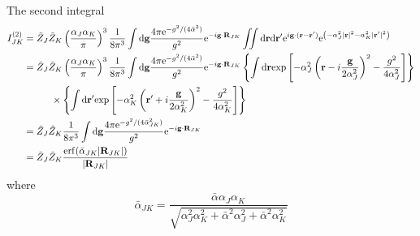 \documentclass[paper=a4, fontsize=11pt]{article} %
\numberwithin{equation}{section} %
\numberwithin{figure}{section} %
\numberwithin{table}{section} %
\newcommand{\bg}{{\bf{g}}}
\newcommand{\br}{{\bf{r}}}
\newcommand{\bR}{{\bf{R}}}
\newcommand{\rexp}{{\mathrm{exp}}}
\newcommand{\re}{{\mathrm{e}}}
\newcommand{\rerf}{{\mathrm{erf}}}
\newcommand{\rd}{{\mathrm{d}}}
\newcommand{\al}{{\alpha}}
\newcommand{\bal}{{\bar{\alpha}}}
\begin{document}
The second integral
\begin{equation}
\begin{split}
I_{JK}^{(2)}
&= \tilde Z_J\tilde Z_K\left(\frac{\al_J\al_K}{\pi}\right)^3\frac{1}{8\pi^3}\int \rd \bg \frac{4\pi \re^{-g^2/(4\bar{\al}^2)}}{g^2}\re^{-i\bg\cdot \bR_{JK}}\iint \rd \br \rd \br' \re^{i\bg\cdot(\br - \br')} \re^{\left(-\al_J^2|\br|^2-\al_K^2|\br'|^2\right)}\\
&= \tilde Z_J\tilde Z_K\left(\frac{\al_J\al_K}{\pi}\right)^3\frac{1}{8\pi^3}\int \rd \bg \frac{4\pi \re^{-g^2/(4\bar{\al}^2)}}{g^2}\re^{-i\bg\cdot \bR_{JK}} \left\{\int \rd \br \rexp\left[-\al_J^2\left(\br - i\frac{\bg}{2\al_J^2}\right)^2 - \frac{g^2}{4\al_J^2}\right] \right\} \\
&\hspace{10mm}\times \left\{\int \rd \br' \rexp\left[-\al_K^2\left(\br' + i\frac{\bg}{2\al_K^2}\right)^2 - \frac{g^2}{4\al_K^2}\right] \right\} \\
&= \tilde Z_J\tilde Z_K \frac{1}{8\pi^3}  \int \rd \bg \frac{4\pi \re^{-g^2/(4\bar{\al}_{JK}^2)}}{g^2} \re^{-i\bg\cdot\bR_{JK}} \\
&= \tilde Z_J \tilde Z_K \frac{\rerf(\bal_{JK} |\bR_{JK}|)}{|\bR_{JK}|}
\end{split}
\end{equation}
where
\begin{equation}
\bal_{JK}= \frac{\bal \al_J \al_K}{\sqrt{\al_J^2 \al_K^2 + \bal^2\al_J^2 + \bal^2 \al_K^2}}
\end{equation}
\end{document}
